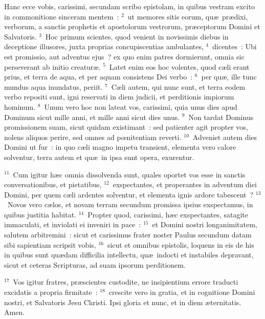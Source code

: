 \lettrine[lines=3,image=true,loversize=0.05,lraise=-0.03]{H}{}anc ecce vobis, carissimi, secundam scribo epistolam, in quibus vestram excito in commonitione sinceram mentem~:
${}^{2}$~ut memores sitis eorum, qu\ae\ pr\ae dixi, verborum, a sanctis prophetis et apostolorum vestrorum, pr\ae ceptorum Domini et Salvatoris.
${}^{3}$~Hoc primum scientes, quod venient in novissimis diebus in deceptione illusores, juxta proprias concupiscentias ambulantes,
${}^{4}$~dicentes~: Ubi est promissio, aut adventus ejus~? ex quo enim patres dormierunt, omnia sic perseverant ab initio creatur\ae .
${}^{5}$~Latet enim eos hoc volentes, quod c\ae li erant prius, et terra de aqua, et per aquam consistens Dei verbo~:
${}^{6}$~per qu\ae , ille tunc mundus aqua inundatus, periit.
${}^{7}$~C\ae li autem, qui nunc sunt, et terra eodem verbo repositi sunt, igni reservati in diem judicii, et perditionis impiorum hominum.
${}^{8}$~Unum vero hoc non lateat vos, carissimi, quia unus dies apud Dominum sicut mille anni, et mille anni sicut dies unus.
${}^{9}$~Non tardat Dominus promissionem suam, sicut quidam existimant~: sed patienter agit propter vos, nolens aliquos perire, sed omnes ad pœnitentiam reverti.
${}^{10}$~Adveniet autem dies Domini ut fur~: in quo c\ae li magno impetu transient, elementa vero calore solventur, terra autem et qu\ae\ in ipsa sunt opera, exurentur.


${}^{11}$~Cum igitur h\ae c omnia dissolvenda sunt, quales oportet vos esse in sanctis conversationibus, et pietatibus,
${}^{12}$~exspectantes, et properantes in adventum diei Domini, per quem c\ae li ardentes solventur, et elementa ignis ardore tabescent~?
${}^{13}$~Novos vero c\ae los, et novam terram secundum promissa ipsius exspectamus, in quibus justitia habitat.
${}^{14}$~Propter quod, carissimi, h\ae c exspectantes, satagite immaculati, et inviolati ei inveniri in pace~:
${}^{15}$~et Domini nostri longanimitatem, salutem arbitremini~: sicut et carissimus frater noster Paulus secundum datam sibi sapientiam scripsit vobis,
${}^{16}$~sicut et omnibus epistolis, loquens in eis de his in quibus sunt qu\ae dam difficilia intellectu, qu\ae\ indocti et instabiles depravant, sicut et ceteras Scripturas, ad suam ipsorum perditionem.


${}^{17}$~Vos igitur fratres, pr\ae scientes custodite, ne insipientium errore traducti excidatis a propria firmitate~:
${}^{18}$~crescite vero in gratia, et in cognitione Domini nostri, et Salvatoris Jesu Christi. Ipsi gloria et nunc, et in diem \ae ternitatis. Amen.

